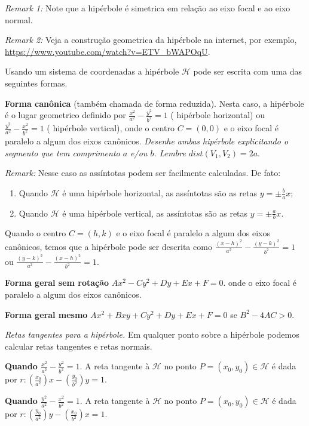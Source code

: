 \documentclass{article}
\begin{document}
 {\it Remark 1: }Note que a hipérbole é simetrica em relação ao eixo focal e  ao eixo normal. 
 
 {\it Remark 2: } Veja a 
 construção geometrica da hipérbole na internet, 
 por exemplo, 
 \url{https://www.youtube.com/watch?v=ETV_bWAPOqU}. 
  
 Usando um sistema de coordenadas a hipérbole $\mathcal{H}$ 
 pode ser escrita com uma das seguintes formas. 
 
 {\bf Forma canônica }(também chamada de forma reduzida).
 Nesta caso, a hipérbole é o lugar geometrico definido por 
 $\frac{x^2}{a^2}-\frac{y^2}{b^2}=1$ ( hipérbole horizontal) ou $\frac{y^2}{a^2}-\frac{x^2}{b^2}=1$ ( hipérbole vertical), 
 onde o centro $C=(0,0)$ e o eixo focal é paralelo a algum dos eixos canônicos.
 {\it Desenhe ambas hipérbole explicitando 
 o segmento que tem comprimento $a$ e/ou $b$. Lembre $dist(V_1,V_2)=2a$}.
 
 {\it Remark:} Nesse caso as assíntotas podem ser facilmente calculadas. 
 De fato:
   \begin{enumerate}
   \item Quando $\mathcal{H}$ é uma hipérbole horizontal, 
   as assíntotas são as retas $y=\pm \frac{b}{a} x$;
   \item Quando $\mathcal{H}$ é uma hipérbole vertical, 
   as assíntotas são as retas $y=\pm \frac{a}{b} x$.
   \end{enumerate}
   
  Quando o centro $C=(h,k)$ e o eixo focal é paralelo a algum dos eixos canônicos, temos que a hipérbole pode ser descrita como 
  $\frac{(x-h)^2}{a^2}-\frac{(y-k)^2}{b^2}=1$ ou 
  $\frac{(y-k)^2}{a^2}-\frac{(x-h)^2}{b^2}=1$. 

 {\bf Forma geral sem rotação} $Ax^2-Cy^{2}+Dy+Ex+F=0$.
 onde o eixo focal é paralelo a algum dos eixos canônicos.
 
 {\bf Forma geral mesmo} $Ax^2+Bxy+Cy^{2}+Dy+Ex+F=0$ se $B^{2}-4AC>0$. \newline
 
 {\it Retas tangentes para a hipérbole. }
 Em qualquer ponto sobre a hipérbole 
 podemos calcular retas tangentes e retas normais.
 
 {\bf Quando $\frac{x^2}{a^2}-\frac{y^2}{b^2}=1$}. 
 A reta tangente à $\mathcal{H}$ no ponto $P=(x_0,y_0) \in \mathcal{H}$ é dada por 
 $ r: (\frac{x_{0}}{a^2})x-(\frac{y_0}{b^{2}})y=1$. 
 
 {\bf Quando $\frac{y^2}{a^2}-\frac{x^2}{b^2}=1$}. 
 A reta tangente à $\mathcal{H}$ no ponto $P=(x_0,y_0) \in \mathcal{H}$ 
 é dada por 
 $ r: (\frac{y_0}{a^{2}})y-(\frac{x_{0}}{b^2})x=1$. \newline
  
\end{document}

